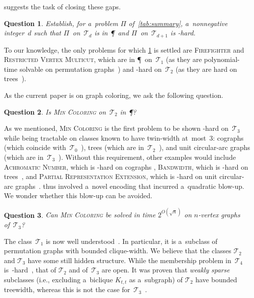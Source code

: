 \documentclass[a4paper,USenglish,cleveref,hyperref,autoref]{lipics-v2021}
\newcommand{\chr}{\textsc{Min Coloring}\xspace}
\newcommand{\bandw}{\textsc{Bandwidth}\xspace}
\newtheorem{question}{Question}%
\begin{document}
 suggests the task of closing these gaps.

\begin{question}\label{q:gaps}
 Establish, for a~problem $\Pi$ of~\cref{tab:summary}, a~nonnegative integer~$d$ such that $\Pi$~on~$\mathcal T_d$ is in \P\ and $\Pi$~on~$\mathcal T_{d+1}$ is \NP-hard. 
\end{question}

To our knowledge, the only problems for which \cref{q:gaps} is settled are \textsc{Firefighter} and \textsc{Restricted Vertex Multicut}, which are in \P\ on~$\mathcal T_1$ (as they are polynomial-time solvable on permutation graphs~\cite{FominHL16,Papadopoulos12}) and \NP-hard on~$\mathcal T_2$ (as they are hard on trees~\cite{FinbowKMR07,Calinescu03}).

As the current paper is on graph coloring, we ask the following question.

\begin{question}\label{q:chr}
  Is \chr on~$\mathcal T_2$ in \P?
\end{question}

As we mentioned, \chr is the first problem to be shown \NP-hard on~$\mathcal T_3$ while being tractable on classes known to have twin-width at~most~3: cographs (which coincide with~$\mathcal T_0$~\cite{twin-width1}), trees (which are in~$\mathcal T_2$~\cite{twin-width1}), and unit circular-arc graphs (which are in~$\mathcal T_3$~\cite[below Theorem 5.5]{Bonnet24hdr}).
Without this requirement, other examples would include \textsc{Achromatic Number}, which is \NP-hard on cographs \cite{Bodlaender89}, \bandw, which is \NP-hard on trees~\cite{Garey78}, and \textsc{Partial Representation Extension}, which is \NP-hard on unit circular-arc graphs~\cite{Fiala22}.
 thus involved a~novel encoding that incurred a~quadratic blow-up. 
We wonder whether this blow-up can be avoided. 

\begin{question}\label{q:subexp}
  Can \chr be solved in time $2^{O(\sqrt{n})}$ on $n$-vertex graphs of~$\mathcal T_3$?
\end{question}

The class~$\mathcal T_1$ is now well understood~\cite{AhnTwinWidthOne}.
In particular, it is a~subclass of permutation graphs with bounded clique-width.
We believe that the classes $\mathcal T_2$ and $\mathcal T_3$ have some still hidden structure.
While the membership problem in~$\mathcal T_4$ is~\NP-hard~\cite{BergeBonnetDepres}, that of $\mathcal T_2$ and of~$\mathcal T_3$ are open.
It was proven that \emph{weakly sparse} subclasses (i.e., excluding a~biclique $K_{t,t}$ as a~subgraph) of $\mathcal T_2$ have bounded treewidth, whereas this is not the case for~$\mathcal T_3$~\cite{BergougnouxG23}.
\end{document}
